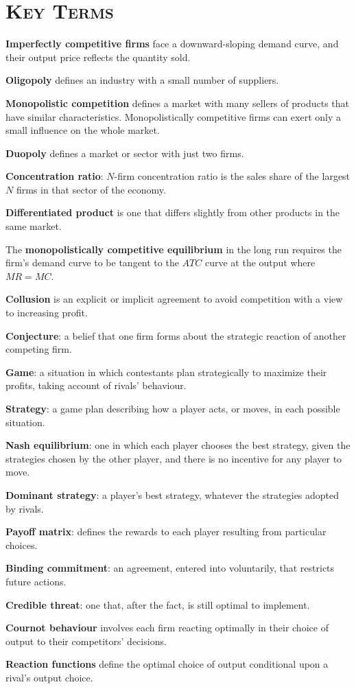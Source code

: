 \newpage
{}
	\section*{\textsc{Key Terms}}
\begin{keyterms}
\textbf{Imperfectly competitive firms} face a downward-sloping demand curve, and their output price reflects the quantity sold.

\textbf{Oligopoly} defines an industry with a small number of suppliers.

\textbf{Monopolistic competition} defines a market with many sellers of products that have similar characteristics. Monopolistically competitive firms can exert only a small influence on the whole market.

\textbf{Duopoly} defines a market or sector with just two firms.

\textbf{Concentration ratio}: $N$-firm concentration ratio is the sales share of the largest $N$ firms in that sector of the economy.

\textbf{Differentiated product} is one that differs slightly from other products in the same market.

The \textbf{monopolistically competitive equilibrium} in the long run requires the firm's demand curve to be tangent to the $ATC$ curve at the output where $MR=MC$.

\textbf{Collusion} is an explicit or implicit agreement to avoid competition with a view to increasing profit.

\textbf{Conjecture}: a belief that one firm forms about the strategic reaction of another competing firm.

\textbf{Game}: a situation in which contestants plan strategically to maximize their profits, taking account of rivals' behaviour.

\textbf{Strategy}: a game plan describing how a player acts, or moves, in each possible situation.

\textbf{Nash equilibrium}: one in which each player chooses the best strategy, given the strategies chosen by the other player, and there is no incentive for any player to move.

\textbf{Dominant strategy}: a player's best strategy, whatever the strategies adopted by rivals.

\textbf{Payoff matrix}: defines the rewards to each player resulting from particular choices.

\textbf{Binding commitment}: an agreement, entered into voluntarily, that restricts future actions.

\textbf{Credible threat}: one that, after the fact, is still optimal to implement.

\textbf{Cournot behaviour} involves each firm reacting optimally in their choice of output to their competitors' decisions.

\textbf{Reaction functions} define the optimal choice of output conditional upon a rival's output choice.
\end{keyterms}